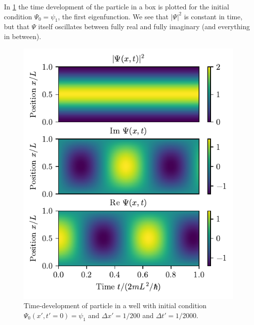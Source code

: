 In \cref{fig:box_time_psi0} the time development of the particle in a box is plotted for the initial condition $\Psi_0 = \psi_1$, the first eigenfunction. We see that $|\Psi|^2$ is constant in time, but that $\Psi$ itself oscillates between fully real and fully imaginary (and everything in between).

\begin{figure}[ht!]%
\centering%
\includegraphics{figs/box_psi0.pdf}%
\caption{Time-development of particle in a well with initial condition $\Psi_0(x',t'=0) = \psi_1$ and $\Delta x' = 1/200$ and $\Delta t' = 1/2000$. \label{fig:box_time_psi0}}%
\end{figure}

